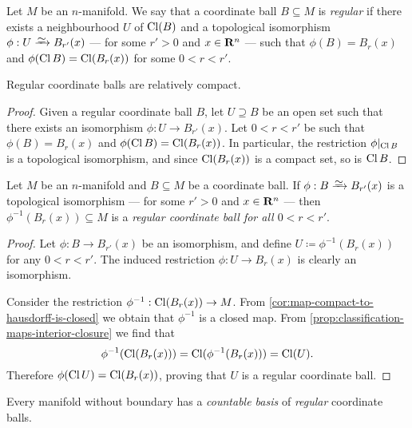\begin{definition}
\label{def:regular-coordinate-ball}
Let \(M\) be an \(n\)-manifold. We say that a coordinate ball \(B \subseteq M\)
is \emph{regular} if there exists a neighbourhood \(U\) of \(\operatorname{Cl}(B)\) and a
topological isomorphism \(\phi: U \isoto B_{r'}(x)\) --- for some \(r' > 0\) and
\(x \in \mathbf{R}^n\) --- such that \(\phi(B) = B_r(x)\) and
\(\phi(\operatorname{Cl} B) = \operatorname{Cl}(B_r(x))\) for some \(0 < r < r'\).
\end{definition}

\begin{corollary}
\label{cor:reg-coord-balls-are-rel-cpct}
Regular coordinate balls are relatively compact.
\end{corollary}

\begin{proof}
Given a regular coordinate ball \(B\), let \(U \supseteq B\) be an open set such
that there exists an isomorphism \(\phi: U \to B_{r'}(x)\). Let \(0 < r < r'\)
be such that \(\phi(B) = B_r(x)\) and \(\phi(\operatorname{Cl} B) = \operatorname{Cl}(B_r(x))\). In
particular, the restriction \(\phi|_{\operatorname{Cl} B}\) is a topological isomorphism, and
since \(\operatorname{Cl}(B_r(x))\) is a compact set, so is \(\operatorname{Cl} B\).
\end{proof}

\begin{lemma}
\label{lem:reg-coord-ball-from-iso}
Let \(M\) be an \(n\)-manifold and \(B \subseteq M\) be a coordinate ball. If
\(\phi: B \isoto B_{r'}(x)\) is a topological isomorphism --- for some
\(r' > 0\) and \(x \in \mathbf{R}^n\) --- then \(\phi^{-1}(B_r(x)) \subseteq M\) is a
\emph{regular coordinate ball for all \(0 < r < r'\)}.
\end{lemma}

\begin{proof}
Let \(\phi: B \to B_{r'}(x)\) be an isomorphism, and define
\(U \coloneq \phi^{-1}(B_r(x))\) for any \(0 < r < r'\). The induced restriction
\(\phi: U \to B_r(x)\) is clearly an isomorphism.

Consider the restriction \(\phi^{-1}: \operatorname{Cl}(B_r(x)) \to M\). From
\cref{cor:map-compact-to-hausdorff-is-closed} we obtain that \(\phi^{-1}\) is a
closed map. From \cref{prop:classification-maps-interior-closure} we find that
\[
\phi^{-1}(\operatorname{Cl}(B_r(x))) = \operatorname{Cl}(\phi^{-1}(B_r(x))) = \operatorname{Cl}(U).
\]
Therefore \(\phi(\operatorname{Cl} U) = \operatorname{Cl}(B_r(x))\), proving that \(U\) is a regular
coordinate ball.
\end{proof}

\begin{proposition}
\label{prop:man-countable-basis-reg-balls}
Every manifold without boundary has a \emph{countable basis} of \emph{regular}
coordinate balls.
\end{proposition}


